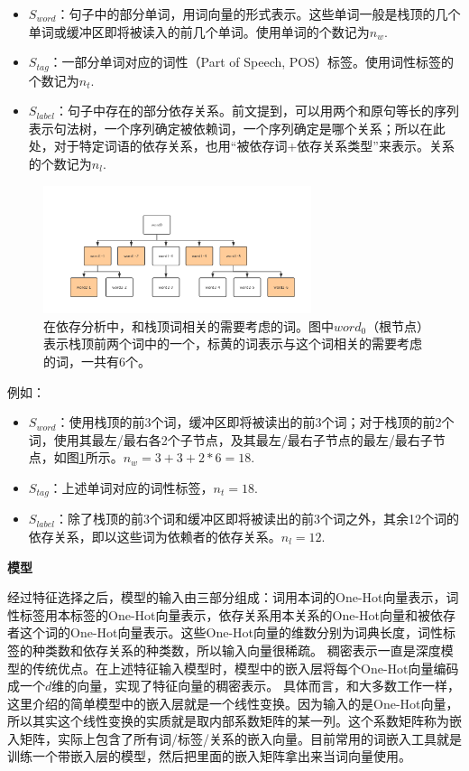 \begin{itemize}
    \item $S_{word}$：句子中的部分单词，用词向量的形式表示。这些单词一般是栈顶的几个单词或缓冲区即将被读入的前几个单词。使用单词的个数记为$n_w$.
    \item $S_{tag}$：一部分单词对应的词性（Part of Speech, POS）标签。使用词性标签的个数记为$n_t$.
    \item $S_{label}$：句子中存在的部分依存关系。前文提到，可以用两个和原句等长的序列表示句法树，一个序列确定被依赖词，一个序列确定是哪个关系；所以在此处，对于特定词语的依存关系，也用“被依存词+依存关系类型”来表示。关系的个数记为$n_l$.
\end{itemize}

\begin{figure}[!htbp]
\centering
\includegraphics[width = 0.7\textwidth]{chap-04/consider-which-six.png}
\caption{在依存分析中，和栈顶词相关的需要考虑的词。图中$word_0$（根节点）表示栈顶前两个词中的一个，标黄的词表示与这个词相关的需要考虑的词，一共有6个。}
\label{04-consider-which-six}
\end{figure}

例如：

\begin{itemize}
    \item $S_{word}$：使用栈顶的前3个词，缓冲区即将被读出的前3个词；对于栈顶的前2个词，使用其最左/最右各2个子节点，及其最左/最右子节点的最左/最右子节点，如图\ref{04-consider-which-six}所示。$n_w = 3 + 3 + 2 * 6 = 18$.
    \item $S_{tag}$：上述单词对应的词性标签，$n_t = 18$.
    \item $S_{label}$：除了栈顶的前3个词和缓冲区即将被读出的前3个词之外，其余12个词的依存关系，即以这些词为依赖者的依存关系。$n_l = 12$.
\end{itemize}


\textbf{模型}

经过特征选择之后，模型的输入由三部分组成：词用本词的One-Hot向量表示，词性标签用本标签的One-Hot向量表示，依存关系用本关系的One-Hot向量和被依存者这个词的One-Hot向量表示。这些One-Hot向量的维数分别为词典长度，词性标签的种类数和依存关系的种类数，所以输入向量很稀疏。
稠密表示一直是深度模型的传统优点。在上述特征输入模型时，模型中的嵌入层将每个One-Hot向量编码成一个$d$维的向量，实现了特征向量的稠密表示。
具体而言，和大多数工作一样，这里介绍的简单模型中的嵌入层就是一个线性变换。因为输入的是One-Hot向量，所以其实这个线性变换的实质就是取内部系数矩阵的某一列。这个系数矩阵称为嵌入矩阵，实际上包含了所有词/标签/关系的嵌入向量。目前常用的词嵌入工具就是训练一个带嵌入层的模型，然后把里面的嵌入矩阵拿出来当词向量使用。

